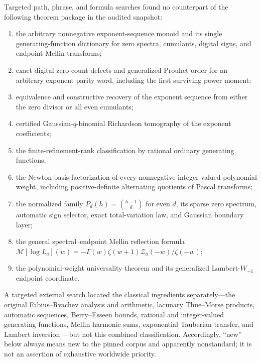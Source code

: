 \documentclass[11pt,oneside]{article}
\numberwithin{equation}{section}
\theoremstyle{definition}
\theoremstyle{remark}
\newcommand{\Mellin}{\mathcal M}
\begin{document}
Targeted path, phrase, and formula searches found no counterpart of the following theorem
package in the audited snapshot:
\begin{enumerate}
\item the arbitrary nonnegative exponent-sequence monoid and its single generating-function
      dictionary for zero spectra, cumulants, digital signs, and endpoint Mellin transforms;
\item exact digital zero-count defects and generalized Prouhet order for an arbitrary
      exponent parity word, including the first surviving power moment;
\item equivalence and constructive recovery of the exponent sequence from either the zero
      divisor or all even cumulants;
\item certified Gaussian-$q$-binomial Richardson tomography of the exponent coefficients;
\item the finite-refinement-rank classification by rational ordinary generating functions;
\item the Newton-basis factorization of every nonnegative integer-valued polynomial weight,
      including positive-definite alternating quotients of Pascal transforms;
\item the normalized family $P_d(h)=\binom{h-1}{d}$ for even $d$, its sparse zero spectrum,
      automatic sign selector, exact total-variation law, and Gaussian boundary layer;
\item the general spectral--endpoint Mellin reflection formula
      $\Mellin[\log L_a](w)=-\Gamma(w)\zeta(w+1)\mathcal Z_a(-w)/\zeta(-w)$;
\item the polynomial-weight universality theorem and its generalized Lambert-$W_{-1}$
      endpoint coordinate.
\end{enumerate}

A targeted external search located the classical ingredients separately---the original
Fabius--Rvachev analysis and arithmetic, lacunary Thue--Morse products, automatic sequences,
Berry--Esseen bounds, rational and integer-valued generating functions, Mellin harmonic sums,
exponential Tauberian transfer, and Lambert inversion
\cite{arias1982,arias2017,aistleitner2015,toth2022,alloucheShallit,petrov1995,
stanley1997,flajolet1995,debruijn1959,corless1996}---but not this combined classification.
Accordingly, ``new'' below always means new to the pinned corpus and apparently nonstandard;
it is not an assertion of exhaustive worldwide priority.
\end{document}
